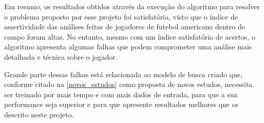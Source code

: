 Em resumo, os resultados obtidos através da execução do algoritmo para resolver o problema proposto por esse projeto foi satisfatória, visto que o índice de assertividade das análises feitas de jogadores de futebol americano dentro de campo foram altas. No entanto, mesmo com um índice satisfatório de acertos, o algoritmo apresenta algumas falhas que podem comprometer uma análise mais detalhada e técnica sobre o jogador.

Grande parte dessas falhas está relacionada ao modelo de busca criado que, conforme citado na \autoref{novos_estudos} como proposta de novos estudos, necessita ser treinado por mais tempo e com mais dados de entrada, para que a sua performance seja superior e para que apresente resultados melhores que os descrito neste projeto.


